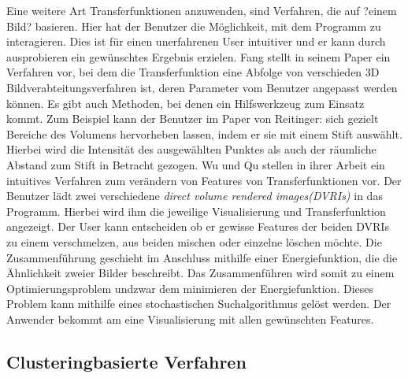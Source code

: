 Eine weitere Art Transferfunktionen anzuwenden, sind Verfahren, die auf ?einem Bild? basieren. Hier hat der Benutzer die Möglichkeit, mit dem Programm zu interagieren. Dies ist für einen unerfahrenen User intuitiver und er kann durch ausprobieren ein gewünschtes Ergebnis erzielen.
\newline
Fang stellt in seinem Paper \cite{fang1998image} ein Verfahren vor, bei dem die  Transferfunktion eine Abfolge von verschieden 3D Bildverabteitungsverfahren ist, deren Parameter vom Benutzer angepasst werden können.
\newline
Es gibt auch Methoden, bei denen ein Hilfswerkzeug zum Einsatz kommt. Zum Beispiel kann der Benutzer im Paper von Reitinger: \cite{reitinger2004user} sich gezielt Bereiche des Volumens hervorheben lassen, indem er sie mit einem Stift auswählt. Hierbei wird die Intensität des ausgewählten Punktes als auch der räumliche Abstand zum Stift in Betracht gezogen.
\newline
Wu und Qu stellen in ihrer Arbeit \cite{wu2007interactive} ein intuitives Verfahren zum verändern von Features von Transferfunktionen vor.
\newline
Der Benutzer lädt zwei verschiedene \textit{direct volume rendered images(DVRIs)} in das Programm. Hierbei wird ihm die jeweilige Visualisierung und Transferfunktion angezeigt. Der User kann entscheiden ob er gewisse Features der beiden DVRIs zu einem verschmelzen, aus beiden mischen oder einzelne löschen möchte. Die Zusammenführung geschieht im Anschluss mithilfe einer Energiefunktion, die die Ähnlichkeit zweier Bilder beschreibt. Das Zusammenführen wird somit zu einem Optimierungsproblem undzwar dem minimieren der Energiefunktion. Dieses Problem kann mithilfe eines stochastischen Suchalgorithmus gelöst werden. Der Anwender bekommt am eine Visualisierung mit allen gewünschten Features.



\subsection{Clusteringbasierte Verfahren}

